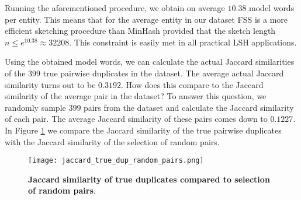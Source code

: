 Running the aforementioned procedure, we obtain on average $10.38$ model words per entity. This means that for the average entity in our dataset FSS is a more efficient sketching procedure than MinHash provided that the sketch length $n \leq e^{10.38} \approx 32208$. This constraint is easily met in all practical LSH applications. 

Using the obtained model words, we can calculate the actual Jaccard similarities of the $399$ true pairwise duplicates in the dataset. The average actual Jaccard similarity turns out to be $0.3192$. How does this compare to the Jaccard similarity of the average pair in the dataset? To answer this question, we randomly sample $399$ pairs from the dataset and calculate the Jaccard similarity of each pair. The average Jaccard similarity of these pairs comes down to $0.1227$. In Figure \ref{fig:jaccard_true_dup_ran_pair} we compare the Jaccard similarity of the true pairwise duplicates with the Jaccard similarity of the selection of random pairs.

\begin{figure}
    \centering
    \texttt{[image: jaccard\_true\_dup\_random\_pairs.png]}
    \caption[Jaccard similarity of true duplicates compared to selection of random pairs]{\textbf{Jaccard similarity of true duplicates compared to selection of random pairs}.}
    \label{fig:jaccard_true_dup_ran_pair}
\end{figure}
